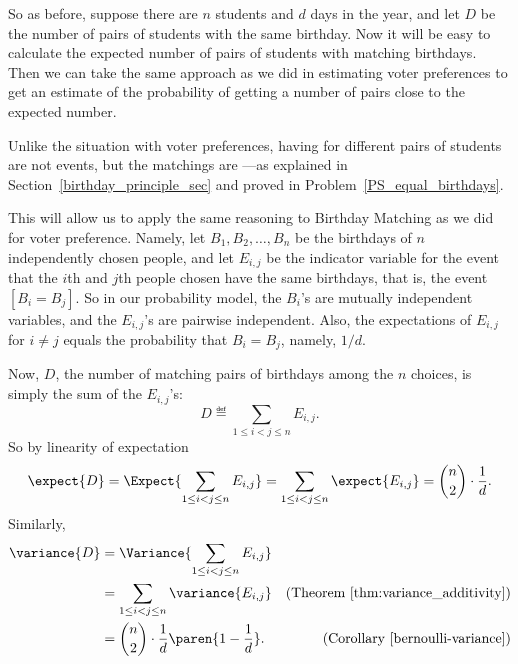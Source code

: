 So as before, suppose there are $n$ students and $d$ days in the year, and
let $D$ be the number of pairs of students with the same birthday.  Now it
will be easy to calculate the expected number of pairs of students with
matching birthdays.  Then we can take the same approach as we did in
estimating voter preferences to get an estimate of the probability of
getting a number of pairs close to the expected number.

Unlike the situation with voter preferences, having  for different pairs of students are not  events, but the matchings are \emph{} ---as explained in
Section~\ref{birthday_principle_sec} and proved in
Problem~\ref{PS_equal_birthdays}.
%
\iffalse For example, knowing that Alice and Bob have matching
birthdays, and also that Ted and Alice have matching birthdays
obviously implies that Bob and Ted have matching birthdays.  On the
other hand, knowing that Alice and Bob have matching birthdays tells
us nothing about whether Alice and Carol have matching birthdays,
namely, these two events really are independent.  So even though the
events that various pairs of students have matching birthdays are not
mutually independent, indeed not even three-way independent, they are
\index{pairwise independent} \emph{pairwise} independent.  \fi
This will allow us to apply the same reasoning to Birthday Matching
as we did for voter preference.  Namely, let $B_1,B_2,\dots,B_n$ be
the birthdays of $n$ independently chosen people, and let $E_{i,j}$ be
the indicator variable for the event that the $i$th and $j$th people
chosen have the same birthdays, that is, the event $[B_i = B_j]$.  So
in our probability model, the $B_i$'s are mutually independent variables,
and the $E_{i,j}$'s are pairwise independent.  Also, the expectations of
$E_{i,j}$ for $i \neq j$ equals the probability that $B_i = B_j$,
namely, $1/d$.

Now, $D$, the number of matching pairs of birthdays among the $n$
choices, is simply the sum of the $E_{i,j}$'s:
\begin{equation}\label{Vn}
D \eqdef \sum_{1\le i < j \le n} E_{i,j}.
\end{equation}
So by linearity of expectation
\[
\expect{D} = \Expect{\sum_{1\le i < j \le n} E_{i,j}} = 
               \sum_{1\le i < j \le n} \expect{E_{i,j}} =
               \binom{n}{2}\cdot \frac{1}{d}.
\]
Similarly,
\begin{align*}
\variance{D}
   & = \Variance{\sum_{1\le i < j \le n} E_{i,j}}\\
   & = \sum_{1\le i < j \le n} \variance{E_{i,j}}
           & \text{(Theorem~\ref{thm:variance_additivity})}\\
   & = \binom{n}{2} \cdot \frac{1}{d}\paren{1-\frac{1}{d}}.
           & \text{(Corollary~\ref{bernoulli-variance})}
\end{align*} 

